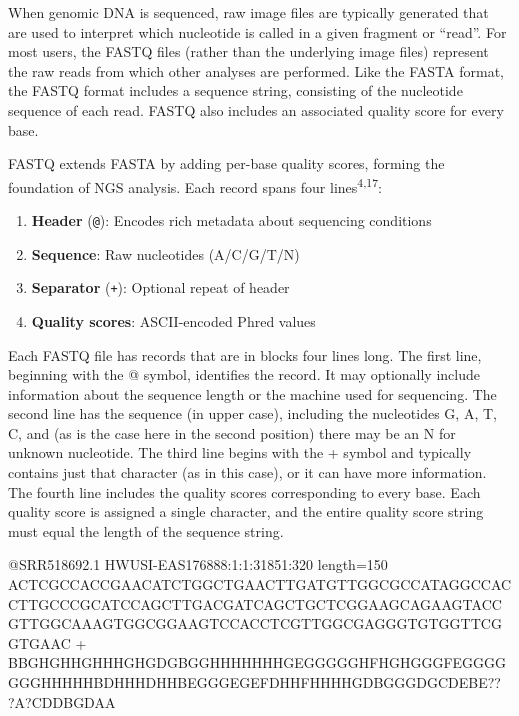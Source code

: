 \documentclass[
  letterpaper,
  DIV=11,
  numbers=noendperiod]{scrreprt}
\providecommand{\tightlist}{%
  \setlength{\itemsep}{0pt}\setlength{\parskip}{0pt}}
\begin{document}
When genomic DNA is sequenced, raw image files are typically generated
that are used to interpret which nucleotide is called in a given
fragment or ``read''. For most users, the FASTQ files (rather than the
underlying image files) represent the raw reads from which other
analyses are performed. Like the FASTA format, the FASTQ format includes
a sequence string, consisting of the nucleotide sequence of each read.
FASTQ also includes an associated quality score for every base.

FASTQ extends FASTA by adding per-base quality scores, forming the
foundation of NGS analysis. Each record spans four
lines\textsuperscript{4,17}:

\begin{enumerate}
\def\labelenumi{\arabic{enumi}.}
\tightlist
\item
  \textbf{Header} (\texttt{@}): Encodes rich metadata about sequencing
  conditions
\item
  \textbf{Sequence}: Raw nucleotides (A/C/G/T/N)\\
\item
  \textbf{Separator} (\texttt{+}): Optional repeat of header
\item
  \textbf{Quality scores}: ASCII-encoded Phred values
\end{enumerate}

Each FASTQ file has records that are in blocks four lines long. The
first line, beginning with the @ symbol, identifies the record. It may
optionally include information about the sequence length or the machine
used for sequencing. The second line has the sequence (in upper case),
including the nucleotides G, A, T, C, and (as is the case here in the
second position) there may be an N for unknown nucleotide. The third
line begins with the + symbol and typically contains just that character
(as in this case), or it can have more information. The fourth line
includes the quality scores corresponding to every base. Each quality
score is assigned a single character, and the entire quality score
string must equal the length of the sequence string.

\begin{tcolorbox}[enhanced jigsaw, toptitle=1mm, arc=.35mm, toprule=.15mm, colframe=quarto-callout-note-color-frame, opacitybacktitle=0.6, breakable, left=2mm, titlerule=0mm, bottomtitle=1mm, rightrule=.15mm, title=\textcolor{quarto-callout-note-color}{\faInfo}\hspace{0.5em}{Note}, opacityback=0, colbacktitle=quarto-callout-note-color!10!white, leftrule=.75mm, coltitle=black, bottomrule=.15mm, colback=white]

@SRR518692.1 HWUSI-EAS176888:1:1:31851:320 length=150
ACTCGCCACCGAACATCTGGCTGAACTTGATGTTGGCGCCATAGGCCACCTTGCCCGCATCCAGCTTGACGATCAGCTGCTCGGAAGCAGAAGTACCGTTGGCAAAGTGGCGGAAGTCCACCTCGTTGGCGAGGGTGTGGTTCGGTGAAC
+
BBGHGHHGHHHGHGDGBGGHHHHHHHGEGGGGGHFHGHGGGFEGGGGGGGHHHHHBDHHHDHHBEGGGEGEFDHHFHHHHGDBGGGDGCDEBE??
?A?CDDBGDAA

\end{tcolorbox}
\end{document}
